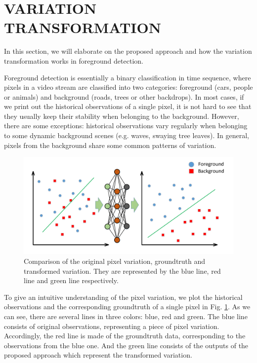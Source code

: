 \documentclass[journal]{IEEEtran}
\newcommand{\reffig}[1]{Fig. \ref{#1}}
\begin{document}
\section{VARIATION TRANSFORMATION}
\label{sec3}
In this section, we will elaborate on the proposed approach and how the variation transformation works in foreground detection.

Foreground detection is essentially a binary classification in time sequence, 
where pixels in a video stream are classified into two categories: foreground (cars, people or animals) and background (roads, trees or other backdrops).
%
In most cases, if we print out the historical observations of a single pixel, 
it is not hard to see that they usually keep their stability when belonging to the background.
%
However, there are some exceptions: historical observations vary regularly when belonging to some dynamic background scenes (e.g. waves, swaying tree leaves).
%
In general, pixels from the background share some common patterns of variation.
\begin{figure}[!t]	%
\centering
    \includegraphics[width=\linewidth]{figure/fig1}
    \caption{Comparison of the original pixel variation, groundtruth and transformed variation. They are represented by the blue line, red line and green line respectively.}
    \label{variation_chart}
\end{figure}

To give an intuitive understanding of the pixel variation, we plot the historical observations and the corresponding groundtruth of a single pixel in  \reffig{variation_chart}.
As we can see, there are several lines in three colors: blue, red and green. 
The blue line consists of original observations, representing a piece of pixel variation. 
Accordingly, the red line is made of the groundtruth data, corresponding to the observations from the blue one.  
And the green line consists of the outputs of the proposed approach which represent the transformed variation. 
\end{document}

